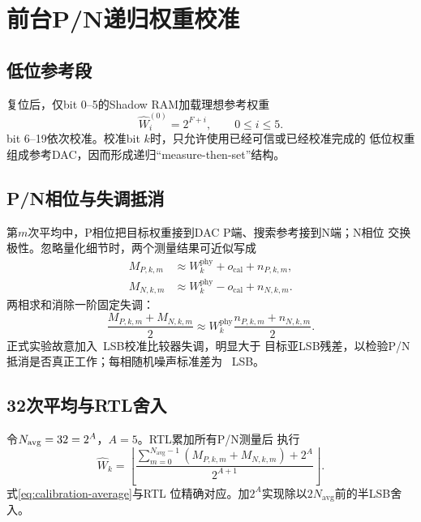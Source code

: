 \documentclass[11pt,a4paper,UTF8,fontset=none,openany]{ctexrep}
\numberwithin{equation}{chapter}
\numberwithin{figure}{chapter}
\numberwithin{table}{chapter}
\begin{document}
\section{前台P/N递归权重校准}

\subsection{低位参考段}

复位后，仅bit 0--5的Shadow RAM加载理想参考权重
\begin{equation}
  \widehat{W}_i^{(0)}=2^{F+i},\qquad 0\le i\le 5.
  \label{eq:trusted-reference}
\end{equation}
bit 6--19依次校准。校准bit $k$时，只允许使用已经可信或已经校准完成的
低位权重组成参考DAC，因而形成递归“measure-then-set”结构。

\subsection{P/N相位与失调抵消}

第$m$次平均中，P相位把目标权重接到DAC P端、搜索参考接到N端；N相位
交换极性。忽略量化细节时，两个测量结果可近似写成
\begin{align}
  M_{P,k,m} &\approx W_k^{\mathrm{phy}}+o_{\mathrm{cal}}+n_{P,k,m},
  \label{eq:p-measure}\\
  M_{N,k,m} &\approx W_k^{\mathrm{phy}}-o_{\mathrm{cal}}+n_{N,k,m}.
  \label{eq:n-measure}
\end{align}
两相求和消除一阶固定失调：
\begin{equation}
  \frac{M_{P,k,m}+M_{N,k,m}}{2}
  \approx W_k^{\mathrm{phy}}
  \frac{n_{P,k,m}+n_{N,k,m}}{2}.
  \label{eq:offset-cancel}
\end{equation}
正式实验故意加入\CalibrationOffsetLsb\ LSB校准比较器失调，明显大于
目标亚LSB残差，以检验P/N抵消是否真正工作；每相随机噪声标准差为
\CalibrationNoiseLsb\ LSB。

\subsection{32次平均与RTL舍入}

令$N_{\mathrm{avg}}=32=2^{A}$，$A=5$。RTL累加所有P/N测量后
执行
\begin{equation}
  \widehat{W}_k=
  \left\lfloor
  \frac{
    \displaystyle\sum_{m=0}^{N_{\mathrm{avg}}-1}
    \left(M_{P,k,m}+M_{N,k,m}\right)+2^A
  }{2^{A+1}}
  \right\rfloor.
  \label{eq:calibration-average}
\end{equation}
式\eqref{eq:calibration-average}与RTL
位精确对应。加$2^A$实现除以$2N_{\mathrm{avg}}$前的半LSB舍入。
\end{document}

